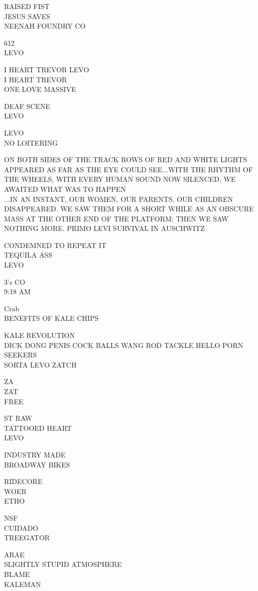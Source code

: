 \documentclass[10pt,letterpaper]{article}
\begin{document}
RAISED FIST\\
JESUS SAVES\\
NEENAH FOUNDRY CO

612\\
LEVO

I HEART TREVOR LEVO\\
I HEART TREVOR\\
ONE LOVE MASSIVE

DEAF SCENE\\
LEVO

LEVO\\
NO LOITERING

ON BOTH SIDES OF THE TRACK ROWS OF RED AND WHITE LIGHTS APPEARED AS FAR AS THE EYE COULD SEE...WITH THE RHYTHM OF THE WHEELS, WITH EVERY HUMAN SOUND NOW SILENCED, WE AWAITED WHAT WAS TO HAPPEN\\
...IN AN INSTANT, OUR WOMEN, OUR PARENTS, OUR CHILDREN DISAPPEARED.  WE SAW THEM FOR A SHORT WHILE AS AN OBSCURE MASS AT THE OTHER END OF THE PLATFORM; THEN WE SAW NOTHING MORE.  PRIMO LEVI  SURVIVAL IN AUSCHWITZ

CONDEMNED TO REPEAT IT\\
TEQUILA ASS\\
LEVO

3's CO\\
9:18 AM

Crab\\
BENEFITS OF KALE CHIPS

KALE REVOLUTION\\
DICK DONG PENIS COCK BALLS WANG ROD TACKLE HELLO PORN SEEKERS\\
SORTA LEVO ZATCH

ZA\\
ZAT\\
FREE

ST RAW\\
TATTOOED HEART\\
LEVO

INDUSTRY MADE\\
BROADWAY BIKES

RIDECORE\\
WOER\\
ETHO

NSF\\
CUIDADO\\
TREEGATOR

ARAE\\
SLIGHTLY STUPID ATMOSPHERE\\
BLAME\\
KALEMAN
\end{document}
